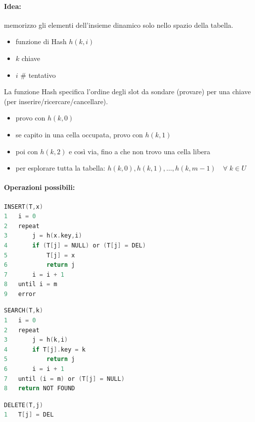 \paragraph{Idea:} memorizzo gli elementi dell'insieme dinamico solo nello spazio della tabella.
\begin{itemize}
    \item funzione di Hash $h(k,i)$
    \item $k$ chiave
    \item $i$ \# tentativo
\end{itemize}
La funzione Hash specifica l'ordine degli slot da sondare (provare) per una chiave (per inserire/ricercare/cancellare).
\begin{itemize}
    \item provo con $h(k,0)$
    \item se capito in una cella occupata, provo con $h(k,1)$
    \item poi con $h(k,2)$ e così via, fino a che non trovo una cella libera
    \item per esplorare tutta la tabella: $h(k,0), h(k,1), \dots, h(k,m-1) \quad \forall\; k \in U$
\end{itemize}

\paragraph{Operazioni possibili:}
\begin{mdframed}
\begin{lstlisting}[language=C]
INSERT(T,x)
1   i = 0
2   repeat
3       j = h(x.key,i)
4       if (T[j] = NULL) or (T[j] = DEL)
5           T[j] = x
6           return j
7       i = i + 1
8   until i = m
9   error
\end{lstlisting}
\end{mdframed}
\begin{mdframed}
\begin{lstlisting}[language=C]
SEARCH(T,k)
1   i = 0
2   repeat
3       j = h(k,i)
4       if T[j].key = k
5           return j
6       i = i + 1
7   until (i = m) or (T[j] = NULL)
8   return NOT FOUND
\end{lstlisting}
\end{mdframed}
\begin{mdframed}
\begin{lstlisting}[language=C]
DELETE(T,j)
1   T[j] = DEL
\end{lstlisting}
\end{mdframed}

